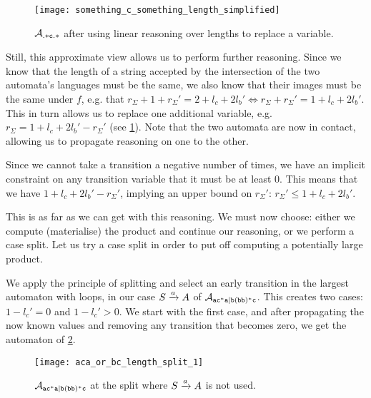 \documentclass[acmsmall,review,anonymous,screen]{acmart}\settopmatter{printfolios=true,printccs=false,printacmref=true}
\theoremstyle{definition}
\begin{document}
\begin{figure}[t]
  \centering 
    \texttt{[image: something\_c\_something\_length\_simplified]}
    \caption{$\mathcal{A}_{\mathtt{.*c.*}}{}$ after using linear reasoning over lengths to replace a variable.}\label{fig:example-length-reduced}
  \end{figure}

Still, this approximate view allows us to perform further reasoning. Since we
know that the length of a string accepted by the intersection of the two
automata's languages must be the same, we also know that their images must be
the same under $f$, e.g. that $r_\Sigma + 1 + r_\Sigma' = 2 + l_c + 2l_b' \iff
r_\Sigma + r_\Sigma' = 1 + l_c + 2l_b'$. This in turn allows us to replace one
additional variable, e.g. $r_\Sigma = 1 + l_c + 2l_b' - r_\Sigma'$ (see
\cref{fig:example-length-reduced}). Note that the two automata are now in
contact, allowing us to propagate reasoning on one to the other.

Since we cannot take a transition a negative number of times, we have an
implicit constraint on any transition variable that it must be at least $0$.
This means that we have $1 + l_c + 2l_b' - r_\Sigma'$, implying an upper bound
on $r_\Sigma'$: $r_\Sigma' \leq 1 + l_c + 2l_b'$.

This is as far as we can get with this reasoning. We must now choose: either we
compute (materialise) the product and continue our reasoning, or we perform a
case split. Let us try a case split in order to put off computing a potentially
large product.

We apply the principle of splitting and select an early transition in the
largest automaton with loops, in our case $S \xrightarrow{a} A$ of $\mathcal{A}_{\mathtt{ac^*a|b(bb)^*c}}$.
This creates two cases: $1-l_c' = 0$ and $1-l_c' > 0$. We start with the first
case, and after propagating the now known values and removing any transition
that becomes zero, we get the automaton of \cref{fig:aca-or-bc-length-split-1}.


\begin{figure}[t]
  \centering 
    \texttt{[image: aca\_or\_bc\_length\_split\_1]}
    \caption{$\mathcal{A}_{\mathtt{ac^*a|b(bb)^*c}}{}$ at the split where $S \xrightarrow{a} A$ is not
    used.}\label{fig:aca-or-bc-length-split-1}
  \end{figure}
\end{document}

